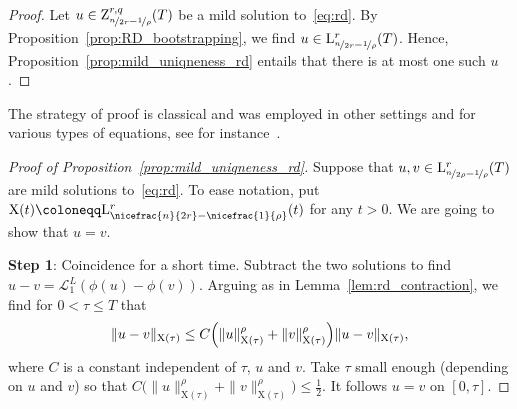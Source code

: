 \documentclass[11pt, leqno]{amsart}
\theoremstyle{definition}
\renewcommand{\L}{\mathrm{L}}
\newcommand{\X}{\mathrm{X}}
\newcommand{\Z}{\mathrm{Z}}
\newcommand{\Soll}{\mathcal{L}}
\begin{document}
	\begin{proof}
		Let $u \in \Z^{r,q}_{\nicefrac{n}{2r} - \nicefrac{1}{\rho}}(T)$ be a mild solution to~\eqref{eq:rd}. By Proposition~\ref{prop:RD_bootstrapping}, we find $u\in \L^r_{\nicefrac{n}{2r} - \nicefrac{1}{\rho}}(T)$. Hence, Proposition~\ref{prop:mild_uniqneness_rd} entails that there is at most one such $u$.
	\end{proof}

	The strategy of proof is classical and was employed in other settings and for various types of equations, see for instance~\cite{Miura}.

	\begin{proof}[Proof of Proposition~\ref{prop:mild_uniqneness_rd}]
		Suppose that $u,v \in \L^r_{\nicefrac{n}{2\rho} - \nicefrac{1}{\rho}}(T)$ are mild solutions to~\eqref{eq:rd}. To ease notation, put $\X(t) \coloneqq \L^r_{\nicefrac{n}{2r} - \nicefrac{1}{\rho}}(t)$ for any $t>0$. We are going to show that $u = v$.

		\textbf{Step 1}: Coincidence for a short time. Subtract the two solutions to find $u - v = \Soll^L_1(\phi(u) - \phi(v))$. Arguing as in Lemma~\ref{lem:rd_contraction}, we find for $0 < \tau \leq T$ that
		\begin{align}
			\| u-v \|_{\X(\tau)} \leq C \Bigl( \| u \|_{\X(\tau)}^\rho + \| v \|_{\X(\tau)}^\rho \Bigr) \| u-v \|_{\X(\tau)},
		\end{align}
		where $C$ is a constant independent of $\tau$, $u$ and $v$. Take $\tau$ small enough (depending on $u$ and $v$) so that $C \bigl( \| u \|_{\X(\tau)}^\rho + \| v \|_{\X(\tau)}^\rho \bigr) \leq \frac{1}{2}$. It follows $u = v$ on $[0,\tau]$.


\end{proof}
\end{document}
